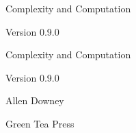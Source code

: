 \documentclass[10pt]{book}
\newcommand{\thetitle}{Complexity and Computation}
\newcommand{\theversion}{0.9.0}
\begin{document}
\frontmatter




\newtheorem{ex}{Exercise}[chapter]

\begin{latexonly}

\renewcommand{\blankpage}{\thispagestyle{empty} \quad \newpage}



\thispagestyle{empty}

\begin{flushright}
\vspace*{2.0in}

\begin{spacing}{3}
{\huge \thetitle}
\end{spacing}

\vspace{0.25in}

Version \theversion

\vfill

\end{flushright}


\blankpage
\blankpage

\pagebreak
\thispagestyle{empty}

\begin{flushright}
\vspace*{2.0in}

\begin{spacing}{3}
{\huge \thetitle}
\end{spacing}

\vspace{0.25in}

Version \theversion

\vspace{1in}


{\Large
Allen Downey\\
}


\vspace{0.5in}

{\Large Green Tea Press}


\end{flushright}
\end{latexonly}
\end{document}
